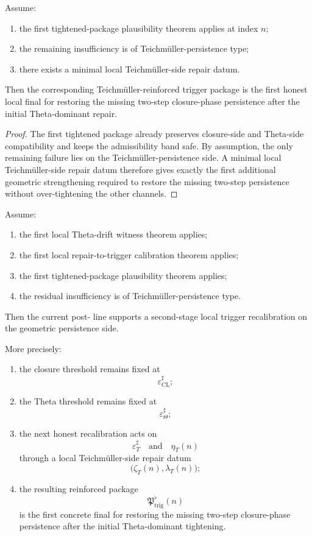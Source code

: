 \begin{lemma}\label{lem:first-local-teichmueller-persistence-repair-lemma}
Assume:
\begin{enumerate}
 \item the first tightened-package plausibility theorem applies at index $n$;
 \item the remaining insufficiency is of Teichm\"uller-persistence type;
 \item there exists a minimal local Teichm\"uller-side repair datum.
\end{enumerate}
Then the corresponding Teichm\"uller-reinforced trigger package is the first honest local final for restoring the missing two-step closure-phase persistence after the initial Theta-dominant repair.
\end{lemma}

\begin{proof}
The first tightened package already preserves closure-side and Theta-side compatibility and keeps the admissibility band safe. By assumption, the only remaining failure lies on the Teichm\"uller-persistence side. A minimal local Teichm\"uller-side repair datum therefore gives exactly the first additional geometric strengthening required to restore the missing two-step persistence without over-tightening the other channels.
\end{proof}

\begin{theorem}\label{thm:first-local-teichmueller-persistence-repair-theorem}
Assume:
\begin{enumerate}
 \item the first local Theta-drift witness theorem applies;
 \item the first local repair-to-trigger calibration theorem applies;
 \item the first tightened-package plausibility theorem applies;
 \item the residual insufficiency is of Teichm\"uller-persistence type.
\end{enumerate}
Then the current post- line supports a second-stage local trigger recalibration on the geometric persistence side.

More precisely:
\begin{enumerate}
 \item the closure threshold remains fixed at
 \[
 \varepsilon_{\mathrm{CL}}^{\sharp};
 \]
 \item the Theta threshold remains fixed at
 \[
 \varepsilon_{\Theta}^{\sharp};
 \]
 \item the next honest recalibration acts on
 \[
 \varepsilon_T^{\sharp}
 \quad\text{and}\quad
 \eta_T(n)
 \]
 through a local Teichm\"uller-side repair datum
 \[
 \bigl(\zeta_T(n),\lambda_T(n)\bigr);
 \]
 \item the resulting reinforced package
 \[
 \mathfrak{P}_{\mathrm{trig}}^{\flat}(n)
 \]
 is the first concrete final for restoring the missing two-step closure-phase persistence after the initial Theta-dominant tightening.
\end{enumerate}
\end{theorem}

